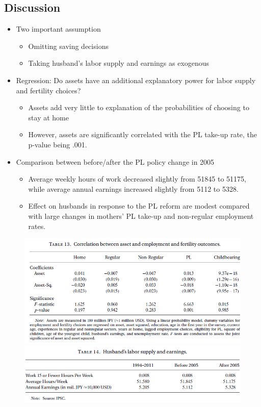 \documentclass[../root]{subfiles}
\begin{document}
    \subsection{Discussion}

    \begin{itemize}
      \item Two important assumption
      \begin{itemize}
        \item Omitting saving decisions
        \item Taking husband's labor supply and earnings as exogenous
      \end{itemize}
      \item Regression: Do assets have an additional explanatory power for labor supply and fertility choices?
      \begin{itemize}
        \item Assets add very little to explanation of the probabilities of choosing to stay at home
        \item However, assets are significantly correlated with the PL take-up rate, the p-value being .001.
      \end{itemize}
      \item Comparison between before/after the PL policy change in 2005
      \begin{itemize}
        \item Average weekly hours of work decreased slightly from 51845 to 51175, while average annual earnings increased slightly from 5112 to 5328.
        \item Effect on husbands in response to the PL reform are modest compared with large changes in mothers’ PL take-up and non-regular employment rates.
      \end{itemize}
    \end{itemize}

    \begin{figure}[h]
      \centering
      \includegraphics[scale = 1]{0619tanji/T13}
      \includegraphics[scale = 1]{0619tanji/T14}
      \label{T13}
    \end{figure}
\end{document}
